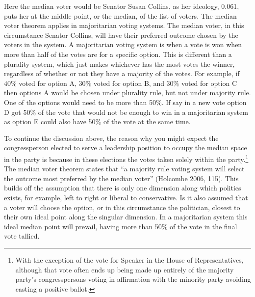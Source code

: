 \documentclass[12pt,twoside]{reedthesis}
\begin{document}
  Here the median voter would be Senator Susan Collins, as her ideology,
  0.061, puts her at the middle point, or the median, of the list of
  voters. The median voter theorem applies in majoritarian voting systems.
  The median voter, in this circumstance Senator Collins, will have their
  preferred outcome chosen by the voters in the system. A majoritarian
  voting system is when a vote is won when more than half of the votes are
  for a specific option. This is different than a plurality system, which
  just makes whichever has the most votes the winner, regardless of
  whether or not they have a majority of the votes. For example, if 40\%
  voted for option A, 30\% voted for option B, and 30\% voted for option C
  then options A would be chosen under plurality rule, but not under
  majority rule. One of the options would need to be more than 50\%. If
  say in a new vote option D got 50\% of the vote that would not be enough
  to win in a majoritarian system as option E could also have 50\% of the
  vote at the same time.
  
  To continue the discussion above, the reason why you might expect the
  congressperson elected to serve a leadership position to occupy the
  median space in the party is because in these elections the votes taken
  solely within the party.\footnote{With the exception of the vote for
    Speaker in the House of Representatives, although that vote often ends
    up being made up entirely of the majority party's congresspersons
    voting in affirmation with the minority party avoiding casting a
    positive ballot.} The median voter theorem states that ``a majority
  rule voting system will select the outcome most preferred by the median
  voter'' (Holcombe 2006, 115). This builds off the assumption that there
  is only one dimension along which politics exists, for example, left to
  right or liberal to conservative. Is it also assumed that a voter will
  choose the option, or in this circumstance the politician, closest to
  their own ideal point along the singular dimension. In a majoritarian
  system this ideal median point will prevail, having more than 50\% of
  the vote in the final vote tallied.
  
\end{document}

